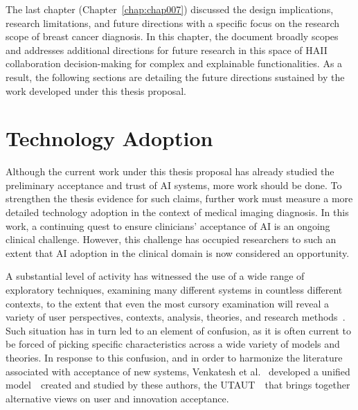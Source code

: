 \clearpage
\label{chap:chap008}

The last chapter (Chapter~\ref{chap:chap007}) discussed the design implications, research limitations, and future directions with a specific focus on the research scope of breast cancer diagnosis.
In this chapter, the document broadly scopes and addresses additional directions for future research in this space of \ac{HAII} collaboration decision-making for complex and explainable functionalities.
As a result, the following sections are detailing the future directions sustained by the work developed under this thesis proposal.

\section{Technology Adoption}
\label{sec:chap008001}

Although the current work under this thesis proposal has already studied the preliminary acceptance and trust of \ac{AI} systems, more work should be done.
To strengthen the thesis evidence for such claims, further work must measure a more detailed technology adoption in the context of medical imaging diagnosis.
In this work, a continuing quest to ensure clinicians' acceptance of \ac{AI} is an ongoing clinical challenge.
However, this challenge has occupied researchers to such an extent that \ac{AI} adoption in the clinical domain is now considered an opportunity.

A substantial level of activity has witnessed the use of a wide range of exploratory techniques, examining many different systems in countless different contexts, to the extent that even the most cursory examination will reveal a variety of user perspectives, contexts, analysis, theories, and research methods~\cite{williams2015unified}.
Such situation has in turn led to an element of confusion, as it is often current to be forced of picking specific characteristics across a wide variety of models and theories.
In response to this confusion, and in order to harmonize the literature associated with acceptance of new systems, Venkatesh et al.~\cite{venkatesh2016unified} developed a unified model~\textendash~created and studied by these authors, the \ac{UTAUT}~\textendash~that brings together alternative views on user and innovation acceptance.

